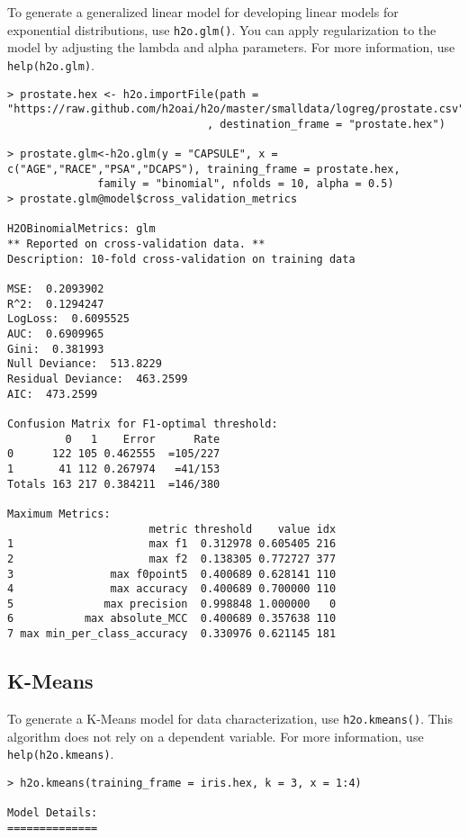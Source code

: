 {{To generate a generalized linear model for developing linear models for exponential distributions, use {\texttt{h2o.glm()}}. You can apply regularization to the model by adjusting the lambda and alpha parameters. 
For more information, use {\texttt{help(h2o.glm)}}.
\smallskip
\begin{lstlisting}[style=R]
> prostate.hex <- h2o.importFile(path = "https://raw.github.com/h2oai/h2o/master/smalldata/logreg/prostate.csv"
                               , destination_frame = "prostate.hex")

> prostate.glm<-h2o.glm(y = "CAPSULE", x = c("AGE","RACE","PSA","DCAPS"), training_frame = prostate.hex,
              family = "binomial", nfolds = 10, alpha = 0.5)
> prostate.glm@model$cross_validation_metrics

H2OBinomialMetrics: glm
** Reported on cross-validation data. **
Description: 10-fold cross-validation on training data

MSE:  0.2093902
R^2:  0.1294247
LogLoss:  0.6095525
AUC:  0.6909965
Gini:  0.381993
Null Deviance:  513.8229
Residual Deviance:  463.2599
AIC:  473.2599

Confusion Matrix for F1-optimal threshold:
         0   1    Error      Rate
0      122 105 0.462555  =105/227
1       41 112 0.267974   =41/153
Totals 163 217 0.384211  =146/380

Maximum Metrics:
                      metric threshold    value idx
1                     max f1  0.312978 0.605405 216
2                     max f2  0.138305 0.772727 377
3               max f0point5  0.400689 0.628141 110
4               max accuracy  0.400689 0.700000 110
5              max precision  0.998848 1.000000   0
6           max absolute_MCC  0.400689 0.357638 110
7 max min_per_class_accuracy  0.330976 0.621145 181

\end{lstlisting}

\subsection{K-Means}

To generate a K-Means model for data characterization, use {\texttt{h2o.kmeans()}}. This algorithm does not rely on a dependent variable. For more information, use {\texttt{help(h2o.kmeans)}}.
\smallskip
\begin{lstlisting}[style=R]
> h2o.kmeans(training_frame = iris.hex, k = 3, x = 1:4)

Model Details:
==============


\end{lstlisting}}}
